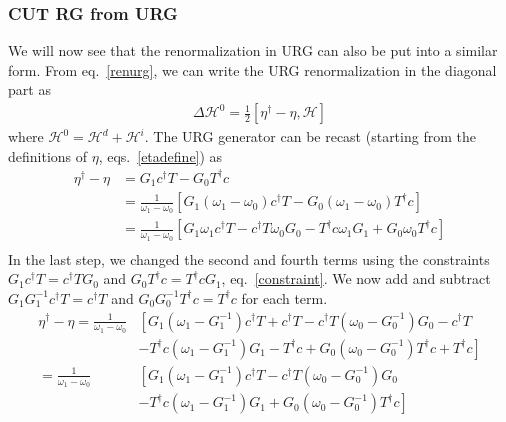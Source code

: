 \documentclass[twoside]{report}
\numberwithin{equation}{section}
\begin{document}
\subsubsection{CUT RG from URG}
We will now see that the renormalization in URG can also be put into a similar form. From eq.~\ref{renurg}, we can write the URG renormalization in the diagonal part as
\begin{equation}\begin{aligned}
	\Delta \mathcal{H}^0 = \frac{1}{2}\left[\eta^\dagger - \eta,\mathcal{H}\right]
\end{aligned}\end{equation}
where \(\mathcal{H}^0 = \mathcal{H}^d + \mathcal{H}^i\). The URG generator can be recast (starting from the definitions of \(\eta\), eqs.~\ref{etadefine}) as
\begin{equation}\begin{aligned}
\eta^\dagger - \eta &= G_1 c^\dagger T - G_0 T^\dagger c\\
		    &= \frac{1}{\omega_1 - \omega_0}\left[G_1 \left(\omega_1 - \omega_0\right)c^\dagger T - G_0 \left(\omega_1 - \omega_0\right)T^\dagger c\right]\\
		    &= \frac{1}{\omega_1 - \omega_0}\left[G_1 \omega_1 c^\dagger T - c^\dagger T\omega_0G_0 - T^\dagger c \omega_1 G_1 +  G_0\omega_0T^\dagger c\right]\\
\end{aligned}\end{equation}
In the last step, we changed the second and fourth terms using the constraints \(G_1 c^\dagger T = c^\dagger T G_0\) and \(G_0 T^\dagger c = T^\dagger c G_1\), eq.~\ref{constraint}. We now add and subtract \(G_1 G_1^{-1}c^\dagger T = c^\dagger T\) and \(G_0 G_0^{-1}T^\dagger c = T^\dagger c\) for each term.
\begin{equation}\begin{aligned}
	\eta^\dagger - \eta = \frac{1}{\omega_1 - \omega_0}&\left[G_1 \left(\omega_1 - G_1^{-1}\right)c^\dagger T + c^\dagger T - c^\dagger T \left(\omega_0 - G_0^{-1}\right) G_0 - c^\dagger T \right.\\
							   &\left.-  T^\dagger c\left(\omega_1 - G_1^{-1}\right)G_1 - T^\dagger c +  G_0\left(\omega_0 - G_0^{-1}\right)T^\dagger c + T^\dagger c\right]\\
	= \frac{1}{\omega_1 - \omega_0}&\left[G_1 \left(\omega_1 - G_1^{-1}\right)c^\dagger T - c^\dagger T \left(\omega_0 - G_0^{-1}\right) G_0 \right.\\
				       &\left.-  T^\dagger c\left(\omega_1 - G_1^{-1}\right)G_1 +  G_0\left(\omega_0 - G_0^{-1}\right)T^\dagger c\right]\\
\end{aligned}\end{equation}
\end{document}
